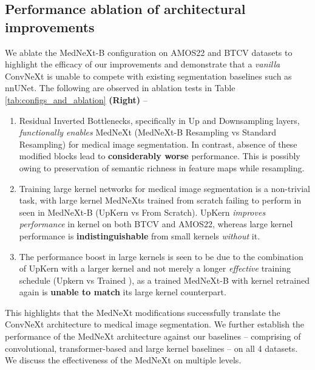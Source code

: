 \documentclass[runningheads]{llncs}
\begin{document}
\subsection{Performance ablation of architectural improvements}
\label{sec:res_abl}
We ablate the MedNeXt-B configuration on AMOS22 and BTCV datasets to highlight the efficacy of our improvements and demonstrate that a \textit{vanilla} ConvNeXt is unable to compete with existing segmentation baselines such as nnUNet. The following are observed in ablation tests in Table \ref{tab:configs_and_ablation} \textbf{(Right)} -- 
\begin{enumerate}
    \item Residual Inverted Bottlenecks, specifically in Up and Downsampling layers, \textit{functionally enables} MedNeXt (MedNeXt-B Resampling vs Standard Resampling) for medical image segmentation. In contrast, absence of these modified blocks lead to \textbf{considerably worse} performance. This is possibly owing to preservation of semantic richness in feature maps while resampling. 
    \item Training large kernel networks for medical image segmentation is a non-trivial task, with large kernel MedNeXts trained from scratch failing to perform in seen in MedNeXt-B (UpKern vs From Scratch). UpKern \textit{improves performance} in kernel  on both BTCV and AMOS22, whereas large kernel performance is \textbf{indistinguishable} from small kernels \textit{without} it. 
    \item The performance boost in large kernels is seen to be due to the combination of UpKern with a larger kernel and not merely a longer \textit{effective} training schedule (Upkern vs Trained ), as a trained MedNeXt-B with kernel  retrained again is \textbf{unable to match} its large kernel counterpart.
\end{enumerate} 

This highlights that the MedNeXt modifications successfully translate the ConvNeXt architecture to medical image segmentation. We further establish the performance of the MedNeXt architecture against our baselines -- comprising of convolutional, transformer-based and large kernel baselines -- on all 4 datasets. We discuss the effectiveness of the MedNeXt on multiple levels.
\end{document}
